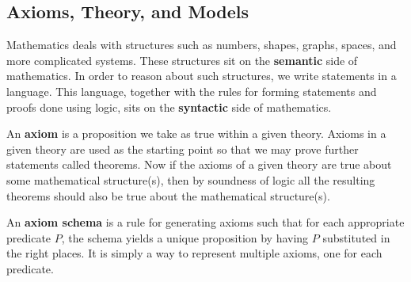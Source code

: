 \subsection{Axioms, Theory, and Models}

Mathematics deals with structures such as numbers, shapes, graphs, spaces, and more complicated systems.
These structures sit on the \textbf{semantic} side of mathematics.
In order to reason about such structures, we write statements in a language.
This language, together with the rules for forming statements and proofs done using logic, sits on the \textbf{syntactic} side of mathematics.

An \textbf{axiom} is a proposition we take as true within a given theory.
Axioms in a given theory are used as the starting point so that we may prove further statements called theorems. 
Now if the axioms of a given theory are true about some mathematical structure(s), then by soundness of logic all the resulting theorems should also be true about the mathematical structure(s). 

An \textbf{axiom schema} is a rule for generating axioms such that for each appropriate predicate $P$, the schema yields a unique proposition by having $P$ substituted in the right places.
It is simply a way to represent multiple axioms, one for each predicate. 

